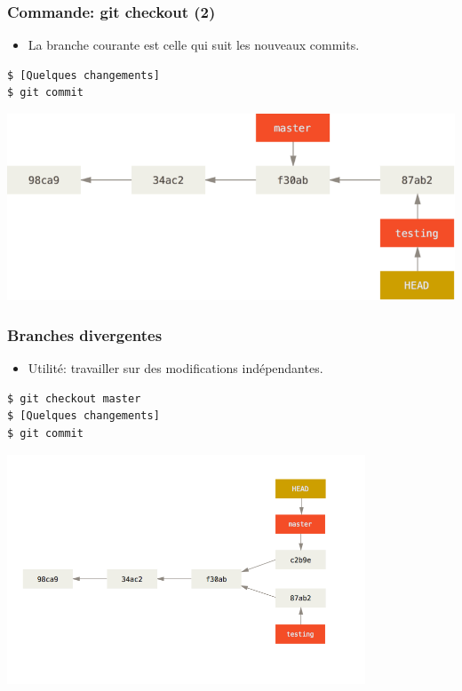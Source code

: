 \documentclass{beamer}
\begin{document}
\begin{frame}[fragile]
    \frametitle{Commande: git checkout (2)}
    \begin{itemize}
        \item La branche courante est celle qui suit les nouveaux commits.
    \end{itemize}
\begin{lstlisting}
$ [Quelques changements]
$ git commit
\end{lstlisting}

    \begin{center}
        \includegraphics[width=\textwidth]{img/advance-testing.png}
    \end{center}
\end{frame}


\begin{frame}[fragile]
    \frametitle{Branches divergentes}
    \begin{itemize}
        \item Utilité: travailler sur des modifications indépendantes.
    \end{itemize}
\begin{lstlisting}
$ git checkout master
$ [Quelques changements]
$ git commit
\end{lstlisting}
    \begin{center}
        \includegraphics[width=0.8\textwidth]{img/advance-master.png}
    \end{center}
\end{frame}
\end{document}
